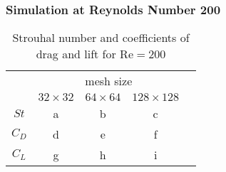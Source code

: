 	\subsubsection{Simulation at Reynolds Number 200}
			\begin{table}[htp]
				\centering
				\begin{tabular}{|c||c|c|c|c}
					\cline{1-4}
					\rule{0pt}{2,3ex}\multirow{2}{*}{}   & \multicolumn{3}{c|}{mesh size} &  \\ \cline{2-4}
					\rule{0pt}{2,3ex}& $32 \times 32$       & $64 \times 64$       & $128 \times 128$      &  \\ \cline{1-4}
					\rule{0pt}{2,3ex}$St$ 				 & a        & b        & c        &  \\ \cline{1-4}
					\rule{0pt}{2,3ex}$C_D$                & d        & e        & f        &  \\ \cline{1-4}
					\rule{0pt}{2,3ex}$C_L$                & g        & h        & i        &  \\ \cline{1-4}
				\end{tabular}
				\caption{Strouhal number and coefficients of drag and lift for $\text{Re}=200$}
				\label{tab:re200}
			\end{table}